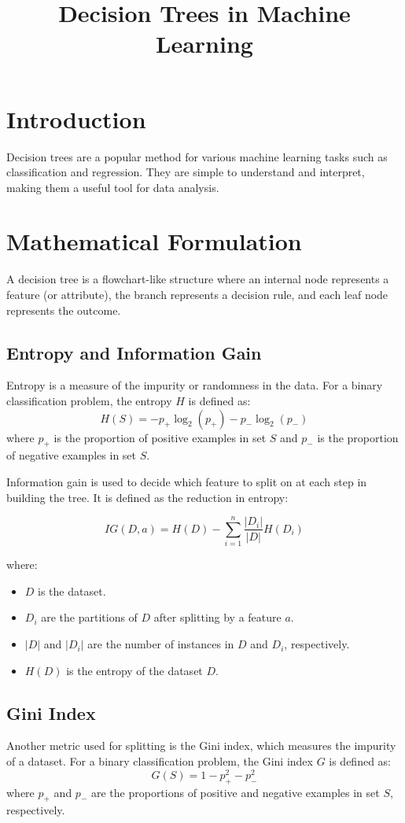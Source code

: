 \documentclass[12pt]{article}
\title{Decision Trees in Machine Learning}
\author{}
\date{}
\begin{document}
\maketitle

\section{Introduction}
Decision trees are a popular method for various machine learning tasks such as classification and regression. They are simple to understand and interpret, making them a useful tool for data analysis.

\section{Mathematical Formulation}
A decision tree is a flowchart-like structure where an internal node represents a feature (or attribute), the branch represents a decision rule, and each leaf node represents the outcome.

\subsection{Entropy and Information Gain}
Entropy is a measure of the impurity or randomness in the data. For a binary classification problem, the entropy \( H \) is defined as:
\[
H(S) = -p_+ \log_2(p_+) - p_- \log_2(p_-)
\]
where \( p_+ \) is the proportion of positive examples in set \( S \) and \( p_- \) is the proportion of negative examples in set \( S \).

Information gain is used to decide which feature to split on at each step in building the tree. It is defined as the reduction in entropy:

\[
IG(D, a) = H(D) - \sum_{i=1}^{n} \frac{|D_i|}{|D|} H(D_i)
\]

where:
\begin{itemize}
    \item \( D \) is the dataset.
    \item \( D_i \) are the partitions of \( D \) after splitting by a feature \( a \).
    \item \( |D| \) and \( |D_i| \) are the number of instances in \( D \) and \( D_i \), respectively.
    \item \( H(D) \) is the entropy of the dataset \( D \).
\end{itemize}

\subsection{Gini Index}
Another metric used for splitting is the Gini index, which measures the impurity of a dataset. For a binary classification problem, the Gini index \( G \) is defined as:
\[
G(S) = 1 - p_+^2 - p_-^2
\]
where \( p_+ \) and \( p_- \) are the proportions of positive and negative examples in set \( S \), respectively.
\end{document}
